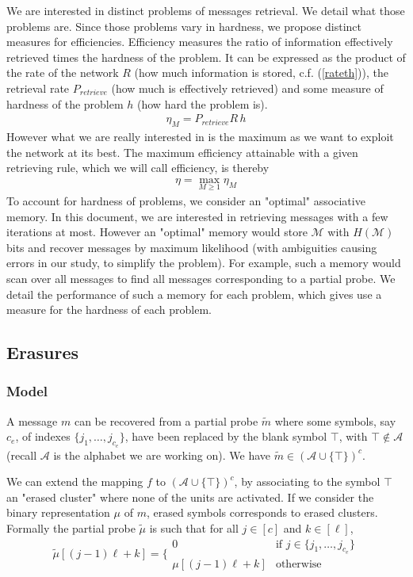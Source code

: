 \documentclass[english,10pt,twocolumn]{IEEEtran}
\renewcommand{\ge}{\geqslant}
\theoremstyle{definition}
\begin{document}
	We are interested in distinct problems of messages retrieval. We detail what those problems are. Since those problems vary in hardness, we propose distinct measures for efficiencies. Efficiency measures the ratio of information effectively retrieved times the hardness of the problem. It can be expressed as the product of the rate of the network $R$ (how much information is stored, c.f. (\ref{rateth})), the retrieval rate $P_{retrieve}$ (how much is effectively retrieved) and some measure of hardness of the problem $h$ (how hard the problem is).
	\begin{align}
		\eta_M = P_{retrieve} R\, h
		\label{defeff}
	\end{align}
	However what we are really interested in is the maximum as we want to exploit the network at its best. The maximum efficiency attainable with a given retrieving rule, which we will call efficiency, is thereby \begin{align}
		\eta = \max_{M \ge 1} \eta_M
		\label{defmaxef}
	\end{align}
	To account for hardness of problems, we consider an "optimal" associative memory. In this document, we are interested in retrieving messages with a few iterations at most. However an "optimal" memory would store $\mathcal{M}$ with $H(\mathcal{M})$ bits and recover messages by maximum likelihood (with ambiguities causing errors in our study, to simplify the problem). For example, such a memory would scan over all messages to find all messages corresponding to a partial probe. We detail the performance of such a memory for each problem, which gives use a measure for the hardness of each problem.
	
	\subsection{Erasures}
	
	\subsubsection{Model}
	
	A message $m$ can be recovered from a partial probe $\tilde{m}$ where some symbols, say $c_e$, of indexes $\{j_1, \dots , j_{c_e} \}$, have been replaced by the blank symbol $\intercal$, with $\intercal \not\in\mathcal{A}$ (recall $\mathcal{A}$ is the alphabet we are working on).  We have $\tilde{m} \in \left( \mathcal{A} \cup \{ \intercal \}\right)^c$.
	
	We can extend the mapping $f$ to $\left( \mathcal{A} \cup \{ \intercal \}\right)^c$, by associating to the symbol $\intercal$ an "erased cluster" where none of the units are activated. If we consider the binary representation $\mu$ of $m$, erased symbols corresponds to erased clusters. %
	Formally the partial probe $\tilde{\mu}$ is such that for all $j\in [c]$ and $k \in [\ell ]$, \[ 
		\tilde{\mu}[(j-1)\ell+k] = \bigg \{ \begin{array}{cl} 0 & \mbox{if } j\in \{j_1, \dots , j_{c_e} \}\\
													\mu[(j-1)\ell+k] & \mbox{otherwise}	
	\end{array}\]
	
\end{document}
